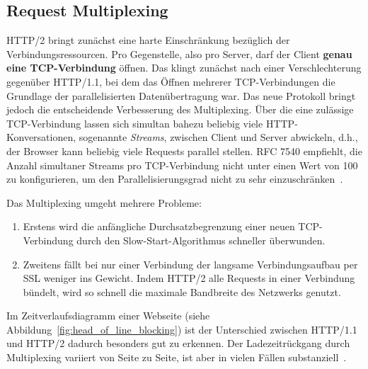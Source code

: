 \documentclass[a4paper, justified, notoc]{tufte-handout} %
\begin{document}
\subsection{Request Multiplexing} %
\label{sub:request_multiplexing}
HTTP/2 bringt zunächst eine harte Einschränkung bezüglich der Verbindungsressourcen. Pro Gegenstelle, also pro Server, darf der Client \textbf{genau eine TCP-Verbindung} öffnen. Das klingt zunächst nach einer Verschlechterung gegenüber HTTP/1.1, bei dem das Öffnen mehrerer TCP-Verbindungen die Grundlage der parallelisierten Datenübertragung war. Das neue Protokoll bringt jedoch die entscheidende Verbesserung des Multiplexing. Über die eine zulässige TCP-Verbindung lassen sich simultan bahezu beliebig viele HTTP-Konversationen, sogenannte \emph{Streams}, zwischen Client und Server abwickeln, d.h., der Browser kann beliebig viele Requests parallel stellen. RFC 7540 empfiehlt, die Anzahl simultaner Streams pro TCP-Verbindung nicht unter einen Wert von 100 zu konfigurieren, um den Parallelisierungsgrad nicht zu sehr einzuschränken~\citep{weinschenkler:2017}.

Das Multiplexing umgeht mehrere Probleme: 
\begin{enumerate}
	\item Erstens wird die anfängliche Durchsatzbegrenzung einer neuen TCP-Verbindung durch den Slow-Start-Algorithmus schneller überwunden.
	\item  Zweitens fällt bei nur einer Verbindung der langsame Verbindungsaufbau per SSL weniger ins Gewicht. Indem HTTP/2 alle Requests in einer Verbindung bündelt, wird so schnell die maximale Bandbreite des Netzwerks genutzt.
\end{enumerate}

Im Zeitverlaufsdiagramm einer Webseite (siehe Abbildung~\ref{fig:head_of_line_blocking}) ist der Unterschied zwischen HTTP/1.1 und HTTP/2 dadurch besonders gut zu erkennen. Der Ladezeitrückgang durch Multiplexing variiert von Seite zu Seite, ist aber in vielen Fällen substanziell~\citep{heise:2018}.
\end{document}
